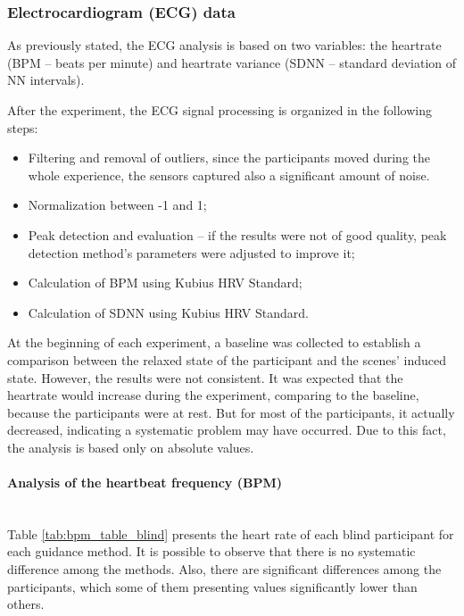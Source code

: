 \subsubsection{Electrocardiogram (ECG) data}
\label{subsubsec:results_ecg_1}


As previously stated, the ECG analysis is based on two variables: the heartrate (BPM – beats per minute) and heartrate variance (SDNN – standard deviation of NN intervals). 

After the experiment, the ECG signal processing is organized in the following steps: 

\begin{itemize}
    \item Filtering and removal of outliers, since the participants moved during the whole experience, the sensors captured also a significant amount of noise. 
    \item Normalization between -1 and 1;
    \item Peak detection and evaluation – if the results were not of good quality, peak detection method’s parameters were adjusted to improve it; 
    \item Calculation of BPM using Kubius HRV Standard;
    \item Calculation of SDNN using Kubius HRV Standard.
\end{itemize}

At the beginning of each experiment, a baseline was collected to establish a comparison between the relaxed state of the participant and the scenes’ induced state. However, the results were not consistent. It was expected that the heartrate would increase during the experiment, comparing to the baseline, because the participants were at rest. But for most of the participants, it actually decreased, indicating a systematic problem may have occurred. Due to this fact, the analysis is based only on absolute values.

\paragraph{Analysis of the heartbeat frequency (BPM)}\mbox{}\\

Table \ref{tab:bpm_table_blind}  presents the heart rate of each blind participant for each guidance method. It is possible to observe that there is no systematic difference among the methods. Also, there are significant differences among the participants, which some of them presenting values significantly lower than others.

